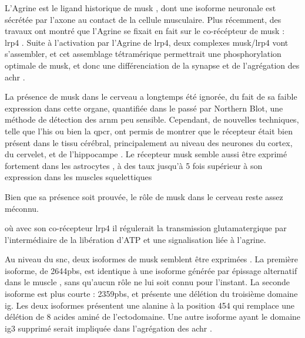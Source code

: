 	L'Agrine est le ligand historique de \gls{musk} \cite{Glass1996}, dont une isoforme neuronale est sécrétée par l'axone au contact de la cellule musculaire. Plus récemment, des travaux ont montré que l'Agrine se fixait en fait sur le co-récépteur de \gls{musk} : \gls{lrp}4 \cite{Zhang2008,Kim2008}. Suite à l'activation par l'Agrine de \acrshort{lrp}4, deux complexes \gls{musk}/\gls{lrp}4 vont s'assembler, et cet assemblage tétramérique permettrait une phosphorylation optimale de \gls{musk}, et donc une différenciation de la synapse et de l'agrégation des \gls{achr} \cite{Zong2012}.
	
	La présence de \gls{musk} dans le cerveau a longtemps été ignorée, du fait de sa faible expression dans cette organe, quantifiée dans le passé par Northern Blot, une méthode de détection des \acrshort{arnm} peu sensible. Cependant, de nouvelles techniques, telle que l'\gls{his} ou bien la \gls{qpcr}, ont permis de montrer que le récepteur était bien présent dans le tissu cérébral, principalement au niveau des neurones du cortex, du cervelet, et de l'hippocampe \cite{Garcia-Osta2006, Ksiazek2007}. Le récepteur \gls{musk} semble aussi être exprimé fortement dans les astrocytes \cite{Sun2016}, à des taux jusqu'à 5 fois supérieur à son expression dans les muscles squelettiques
	
	Bien que sa présence soit prouvée, le rôle de \gls{musk} dans le cerveau reste assez méconnu. 
	
	 où avec son co-récepteur \gls{lrp}4 il régulerait la transmission glutamatergique par l'intermédiaire de la libération d'ATP et une signalisation liée à l'agrine.
	
	Au niveau du \gls{snc}, deux isoformes de \gls{musk} semblent être exprimées \cite{Garcia-Osta2006}. La première isoforme, de 2644pbs, est identique à une isoforme générée par épissage alternatif dans le muscle \cite{Valenzuela1995}, sans qu'aucun rôle ne lui soit connu pour l'instant. La seconde isoforme est plus courte : 2359pbs, et présente une délétion du troisième domaine \gls{ig}. Les deux isoformes présentent une alanine à la position 454 qui remplace une délétion de 8 acides aminé de l'ectodomaine. Une autre isoforme ayant le domaine \gls{ig}3 supprimé serait impliquée dans l'agrégation des \gls{achr} \cite{Hesser1999}.
	
